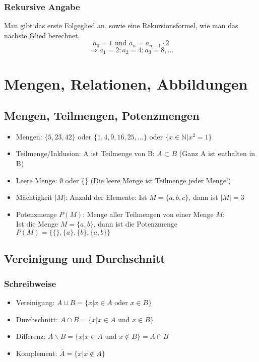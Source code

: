 \subsubsection{Rekursive Angabe}
Man gibt das erste Folgeglied an, sowie eine Rekursionsformel,
wie man das nächste Glied berechnet.
\[a_0 = 1 \text{ und } a_n = a_{n-1} \cdot 2 \]
\[ \Rightarrow a_1 = 2; a_2 = 4; a_3 = 8, ... \]

\section{Mengen, Relationen, Abbildungen}

\subsection{Mengen, Teilmengen, Potenzmengen}
\begin{itemize}
  \item Mengen: $\{5, 23, 42\}$ oder $\{1, 4, 9, 16, 25, ...\}$ oder
  $\{x \in \mathbb{N} | x^2 = 1 \}$
  \item Teilmenge/Inklusion: A ist Teilmenge von B: $A \subset B$ (Ganz A ist enthalten in B)
  \item Leere Menge: $\emptyset$ oder $\{ \}$ (Die leere Menge ist
    Teilmenge jeder Menge!)
  \item Mächtigkeit $|M|$: Anzahl der Elemente: Ist $M = \{a, b, c\}$, dann ist $|M| = 3$
  \item Potenzmenge $P(M)$: Menge aller Teilmengen von einer Menge $M$:
  \\ Ist die Menge $M = \{a, b\}$, dann ist die Potenzmenge $P(M) = \{\{\},
  \{a\}, \{b\}, \{a, b\}\}$
\end{itemize}

\subsection{Vereinigung und Durchschnitt}
\subsubsection{Schreibweise}
\begin{itemize}
  \item Vereinigung: $A \cup B = \{ x | x \in A \text{ oder } x \in B \}$
  \item Durchschnitt: $A \cap B = \{ x | x \in A \text{ und } x \in B \}$
  \item Differenz: $A \backslash B = \{ x | x \in A \text{ und } x
    \notin B \} = A \cap \overline B$
  \item Komplement: $\overline A = \{ x | x \notin A \}$
\end{itemize}


